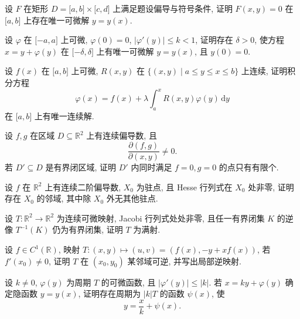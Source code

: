 \documentclass[../../数学分析培优讲义.tex]{subfiles}
\begin{document}
\begin{example}
设 $F$ 在矩形 $D=\lbrack a,b\rbrack\times\lbrack c,d\rbrack$ 上满足题设偏导与符号条件, 证明 $F(x,y)=0$ 在 $\lbrack a,b\rbrack$ 上存在唯一可微解 $y=y(x)$.
\end{example}
\exampleblank

\begin{example}
设 $\varphi$ 在 $\lbrack-a,a\rbrack$ 上可微, $\varphi(0)=0$, $|\varphi'(y)|\leq k<1$, 证明存在 $\delta>0$, 使方程 $x=y+\varphi(y)$ 在 $\lbrack-\delta,\delta\rbrack$ 上有唯一可微解 $y=y(x)$, 且 $y(0)=0$.
\end{example}
\exampleblank

\begin{example}
设 $f(x)$ 在 $\lbrack a,b\rbrack$ 上可微, $R(x,y)$ 在 $\{(x,y)\mid a\leq y\leq x\leq b\}$ 上连续, 证明积分方程
\[
    \varphi(x)=f(x)+\lambda\int_a^xR(x,y)\varphi(y)\,\mathrm{d}y
\]
在 $\lbrack a,b\rbrack$ 上有唯一连续解.
\end{example}
\exampleblank

\begin{example}
设 $f,g$ 在区域 $D\subseteq\mathbb{R}^2$ 上有连续偏导数, 且
\[
    \dfrac{\partial(f,g)}{\partial(x,y)}\ne0.
\]
若 $D'\subseteq D$ 是有界闭区域, 证明 $D'$ 内同时满足 $f=0,g=0$ 的点只有有限个.
\end{example}
\exampleblank

\begin{example}
设 $f$ 在 $\mathbb{R}^2$ 上有连续二阶偏导数, $X_0$ 为驻点, 且 Hesse 行列式在 $X_0$ 处非零, 证明存在 $X_0$ 的邻域, 其中除 $X_0$ 外无其他驻点.
\end{example}
\exampleblank

\begin{example}
设 $T:\mathbb{R}^2\to\mathbb{R}^2$ 为连续可微映射, Jacobi 行列式处处非零, 且任一有界闭集 $K$ 的逆像 $T^{-1}(K)$ 仍为有界闭集, 证明 $T$ 为满射.
\end{example}
\exampleblank

\begin{example}
设 $f\in C^1(\mathbb{R})$, 映射 $T:(x,y)\mapsto(u,v)=(f(x),-y+xf(x))$, 若 $f'(x_0)\ne0$, 证明 $T$ 在 $(x_0,y_0)$ 某邻域可逆, 并写出局部逆映射.
\end{example}
\exampleblank

\begin{example}
设 $k\ne0$, $\varphi(y)$ 为周期 $T$ 的可微函数, 且 $|\varphi'(y)|\leq|k|$. 若 $x=ky+\varphi(y)$ 确定隐函数 $y=y(x)$, 证明存在周期为 $|k|T$ 的函数 $\psi(x)$, 使
\[
    y=\dfrac{x}{k}+\psi(x).
\]
\end{example}
\exampleblank
\end{document}
